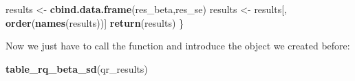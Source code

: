 \documentclass[]{book}
\newenvironment{Shaded}{\begin{snugshade}}{\end{snugshade}}
\newcommand{\KeywordTok}[1]{\textcolor[rgb]{0.13,0.29,0.53}{\textbf{#1}}}
\newcommand{\StringTok}[1]{\textcolor[rgb]{0.31,0.60,0.02}{#1}}
\newcommand{\NormalTok}[1]{#1}
\begin{document}
\begin{Shaded}
\begin{Highlighting}[]
\NormalTok{        results <-}\StringTok{ }\KeywordTok{cbind.data.frame}\NormalTok{(res_beta,res_se)}
\NormalTok{        results <-}\StringTok{ }\NormalTok{results[, }\KeywordTok{order}\NormalTok{(}\KeywordTok{names}\NormalTok{(results))]}
        \KeywordTok{return}\NormalTok{(results)}
\NormalTok{\}}
\end{Highlighting}
\end{Shaded}

Now we just have to call the function and introduce the object we
created before:

\begin{Shaded}
\begin{Highlighting}[]
\KeywordTok{table_rq_beta_sd}\NormalTok{(qr_results)}
\end{Highlighting}
\end{Shaded}
\end{document}

